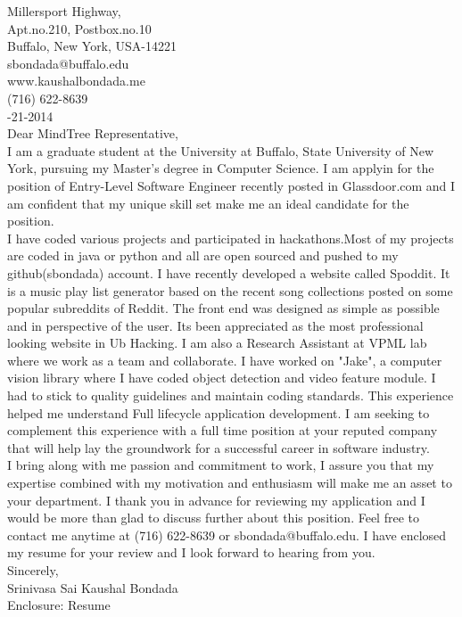 \documentclass[10pt,letterpaper,oneside]{article}
\begin{document}
 Millersport Highway,\\
Apt.no.210, Postbox.no.10\\
Buffalo, New York, USA-14221\\
sbondada@buffalo.edu\\
www.kaushalbondada.me\\
(716) 622-8639\\

-21-2014\\
 
\noindent Dear MindTree Representative,\\
 
I am a graduate student at the University at Buffalo, State University of New York, pursuing my Master's degree in Computer Science. I am applyin
for the position of Entry-Level Software Engineer recently posted in Glassdoor.com and I am confident that my unique skill set
make me an ideal candidate for the position.\\

I have coded various projects and participated in hackathons.Most of my projects are coded in java or python and all are open sourced and
pushed to my github(sbondada) account. I have recently developed a website called Spoddit. It is a music play list generator based on the
recent song collections posted on some popular subreddits of Reddit. The front end was designed as simple as possible and in perspective of the
user. Its been
appreciated as the most professional looking website in Ub Hacking. I am also a Research Assistant at VPML lab where we work as a team and collaborate. I have worked on "Jake", a computer vision
library where I have coded object detection and video feature module. I had to stick to quality guidelines and maintain coding standards.
This experience helped me understand Full lifecycle application development. I am seeking to complement this experience with a full time position at your reputed company that will help lay the groundwork for a successful career in software industry.\\

I bring along with me passion and commitment to work, I assure you that my expertise combined with my motivation
and enthusiasm will make me an asset to your department. I thank you in advance for reviewing my application and I would be more than glad to
discuss further about this position. Feel free to contact me anytime at (716) 622-8639 or sbondada@buffalo.edu. I have enclosed my resume for your review and I look forward to hearing from you.\\
 
\noindent Sincerely,\\
Srinivasa Sai Kaushal Bondada\\
Enclosure: Resume\\
\end{document}
